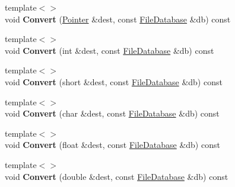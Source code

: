 \begin{DoxyCompactItemize}
\item 
\hypertarget{class_assimp_1_1_blender_1_1_structure_a7c6a9a878896b0bf746d1108567f0588}{{\footnotesize template$<$$>$ }\\void {\bfseries Convert} (\hyperlink{struct_assimp_1_1_blender_1_1_pointer}{Pointer} \&dest, const \hyperlink{class_assimp_1_1_blender_1_1_file_database}{File\+Database} \&db) const }\label{class_assimp_1_1_blender_1_1_structure_a7c6a9a878896b0bf746d1108567f0588}

\item 
\hypertarget{class_assimp_1_1_blender_1_1_structure_aee5f8acc02b88e4f4507ebe6249eed55}{{\footnotesize template$<$$>$ }\\void {\bfseries Convert} (int \&dest, const \hyperlink{class_assimp_1_1_blender_1_1_file_database}{File\+Database} \&db) const }\label{class_assimp_1_1_blender_1_1_structure_aee5f8acc02b88e4f4507ebe6249eed55}

\item 
\hypertarget{class_assimp_1_1_blender_1_1_structure_a5378a3809dbc2704e1fa35ab6a2cc493}{{\footnotesize template$<$$>$ }\\void {\bfseries Convert} (short \&dest, const \hyperlink{class_assimp_1_1_blender_1_1_file_database}{File\+Database} \&db) const }\label{class_assimp_1_1_blender_1_1_structure_a5378a3809dbc2704e1fa35ab6a2cc493}

\item 
\hypertarget{class_assimp_1_1_blender_1_1_structure_acdfa981f58868cd82eccc67263a05924}{{\footnotesize template$<$$>$ }\\void {\bfseries Convert} (char \&dest, const \hyperlink{class_assimp_1_1_blender_1_1_file_database}{File\+Database} \&db) const }\label{class_assimp_1_1_blender_1_1_structure_acdfa981f58868cd82eccc67263a05924}

\item 
\hypertarget{class_assimp_1_1_blender_1_1_structure_a764017558465edf6ff70bc4fc3096962}{{\footnotesize template$<$$>$ }\\void {\bfseries Convert} (float \&dest, const \hyperlink{class_assimp_1_1_blender_1_1_file_database}{File\+Database} \&db) const }\label{class_assimp_1_1_blender_1_1_structure_a764017558465edf6ff70bc4fc3096962}

\item 
\hypertarget{class_assimp_1_1_blender_1_1_structure_a3ff081db7b32dd040e16494adb7e014a}{{\footnotesize template$<$$>$ }\\void {\bfseries Convert} (double \&dest, const \hyperlink{class_assimp_1_1_blender_1_1_file_database}{File\+Database} \&db) const }\label{class_assimp_1_1_blender_1_1_structure_a3ff081db7b32dd040e16494adb7e014a}


\end{DoxyCompactItemize}

